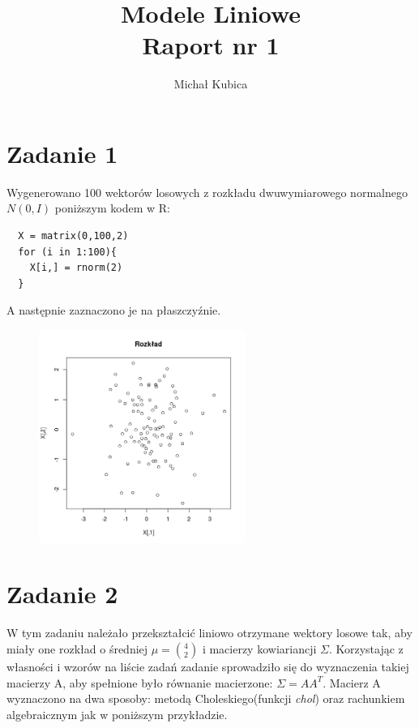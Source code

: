 \documentclass[9pt]{article}  %
\begin{document}
\author{Michał Kubica}
\title{Modele Liniowe \\ Raport nr 1}       
\maketitle                     %

\section{Zadanie 1}            %

    Wygenerowano 100 wektorów losowych z rozkładu dwuwymiarowego normalnego $N \left( 0, I \right)$ poniższym kodem w R:

    \begin{lstlisting}
  X = matrix(0,100,2)
  for (i in 1:100){
    X[i,] = rnorm(2)
  }
    \end{lstlisting}    
    
    A następnie zaznaczono je na płaszczyźnie.
    
    \begin{figure}[H]
      \centering
      \includegraphics[width=0.6\textwidth]{zad1.png}
      \caption {}
    \end{figure}
    

    
    \section{Zadanie 2}
    
    W tym zadaniu należało przekształcić liniowo otrzymane wektory losowe tak, aby miały one rozkład o średniej $\mu = {4 \choose 2}$ i macierzy kowiariancji $\Sigma$. Korzystając z własności i wzorów na liście zadań zadanie sprowadziło się do wyznaczenia takiej macierzy A, aby spełnione było równanie macierzone: 
    $ \Sigma = AA^T$.
    Macierz A wyznaczono na dwa sposoby: metodą Choleskiego(funkcji \textit{chol}) oraz rachunkiem algebraicznym jak w poniższym przykładzie.\newline
    \newline
        
\end{document}
